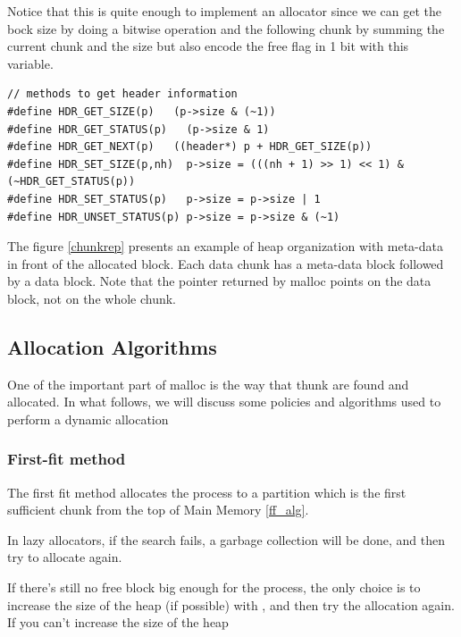 Notice that this is quite enough to implement an allocator since we can get the bock size by doing a bitwise operation and the following chunk by summing the current chunk and the size but also encode the free flag in 1 bit with this variable.

\begin{lstlisting}[style=cstyle]
// methods to get header information
#define HDR_GET_SIZE(p)   (p->size & (~1))
#define HDR_GET_STATUS(p)   (p->size & 1)
#define HDR_GET_NEXT(p)   ((header*) p + HDR_GET_SIZE(p))
#define HDR_SET_SIZE(p,nh)  p->size = (((nh + 1) >> 1) << 1) & (~HDR_GET_STATUS(p))
#define HDR_SET_STATUS(p)   p->size = p->size | 1
#define HDR_UNSET_STATUS(p) p->size = p->size & (~1)
\end{lstlisting}

The figure \ref{chunkrep} presents an example of heap organization with meta-data in front of the allocated block. Each data chunk has a meta-data block followed by a data block. Note that the pointer returned by malloc points on the data block, not on the whole chunk.\\

\subsection{Allocation Algorithms}
  One of the important part of malloc is the way that thunk are found and allocated. In what follows, we will discuss some policies and algorithms used to perform a dynamic allocation
\subsubsection{First-fit method}
The first fit method allocates the process to a partition which is the first sufficient chunk from the top of Main Memory \ref{ff_alg}.

In lazy allocators, if the search fails, a garbage collection will be done, and then try to allocate again.

If there’s still no free block big enough for the process, the only choice is to increase the size of the heap (if possible) with , and then try the allocation again.
If you can’t increase the size of the heap

